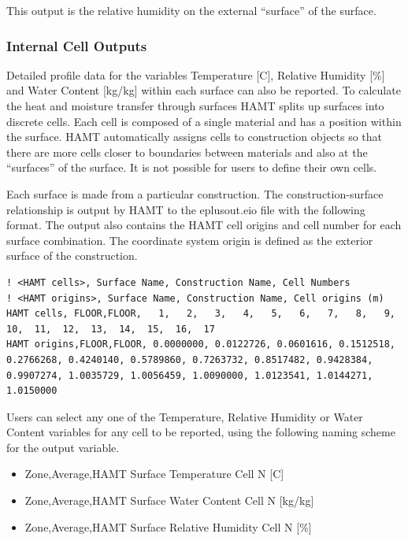 This output is the relative humidity on the external ``surface'' of the surface.

\subsubsection{Internal Cell Outputs}\label{internal-cell-outputs}

Detailed profile data for the variables Temperature {[}C{]}, Relative Humidity {[}\%{]} and Water Content {[}kg/kg{]} within each surface can also be reported. To calculate the heat and moisture transfer through surfaces HAMT splits up surfaces into discrete cells. Each cell is composed of a single material and has a position within the surface. HAMT automatically assigns cells to construction objects so that there are more cells closer to boundaries between materials and also at the ``surfaces'' of the surface. It is not possible for users to define their own cells.

Each surface is made from a particular construction. The construction-surface relationship is output by HAMT to the eplusout.eio file with the following format. The output also contains the HAMT cell origins and cell number for each surface combination. The coordinate system origin is defined as the exterior surface of the construction.

\begin{lstlisting}
! <HAMT cells>, Surface Name, Construction Name, Cell Numbers
! <HAMT origins>, Surface Name, Construction Name, Cell origins (m)
HAMT cells, FLOOR,FLOOR,   1,   2,   3,   4,   5,   6,   7,   8,   9,  10,  11,  12,  13,  14,  15,  16,  17
HAMT origins,FLOOR,FLOOR, 0.0000000, 0.0122726, 0.0601616, 0.1512518, 0.2766268, 0.4240140, 0.5789860, 0.7263732, 0.8517482, 0.9428384, 0.9907274, 1.0035729, 1.0056459, 1.0090000, 1.0123541, 1.0144271, 1.0150000
\end{lstlisting}

Users can select any one of the Temperature, Relative Humidity or Water Content variables for any cell to be reported, using the following naming scheme for the output variable.

\begin{itemize}
\item
  Zone,Average,HAMT Surface Temperature Cell N {[}C{]}
\item
  Zone,Average,HAMT Surface Water Content Cell N {[}kg/kg{]}
\item
  Zone,Average,HAMT Surface Relative Humidity Cell N {[}\%{]}
\end{itemize}

